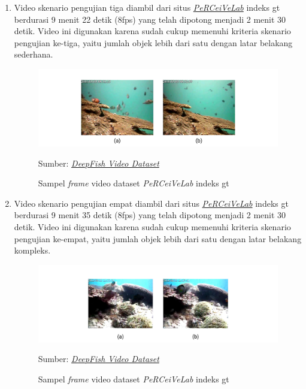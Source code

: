 \begin{enumerate}
\begin{figure}[H]
                \end{figure}
                \item Video skenario pengujian tiga diambil dari situs \href{http://www.perceivelab.com/datasets}{\textit{PeRCeiVeLab}}
                indeks gt berdurasi 9 menit 22 detik (8fps) yang telah dipotong menjadi 2 menit 30 detik. Video ini digunakan karena sudah cukup memenuhi kriteria skenario pengujian ke-tiga, yaitu jumlah objek lebih dari satu dengan latar belakang sederhana.
                \vspace{-0.5cm}
                \begin{figure}[H]
                \centering
                  \singlespacing
                  \captionsetup{justification=centering,margin=0.5cm}
                  \includegraphics[width=12cm]{image/sample_frame_gt_124.jpg}
                  \caption{Sampel \textit{frame} video dataset \textit{PeRCeiVeLab} indeks gt}
                  \small{Sumber: \href{https://alzayats.github.io/DeepFish/}{\textit{DeepFish Video Dataset}}}
                  \label{fig:sample_9866}
                \end{figure}
                \item Video skenario pengujian empat diambil dari situs \href{http://www.perceivelab.com/datasets}{\textit{PeRCeiVeLab}}
                indeks gt berdurasi 9 menit 35 detik (8fps) yang telah dipotong menjadi 2 menit 30 detik. Video ini digunakan karena sudah cukup memenuhi kriteria skenario pengujian ke-empat, yaitu jumlah objek lebih dari satu dengan latar belakang kompleks.
                \vspace{-0.5cm}
                \begin{figure}[H]
                \centering
                  \singlespacing
                  \captionsetup{justification=centering,margin=0.5cm}
                  \includegraphics[width=14cm]{image/sample_frame_gt_116.jpg}
                  \caption{Sampel \textit{frame} video dataset \textit{PeRCeiVeLab} indeks gt}
                  \small{Sumber: \href{https://alzayats.github.io/DeepFish/}{\textit{DeepFish Video Dataset}}}
                  \label{fig:sample_9866}
                \end{figure}
            \end{enumerate}
        
